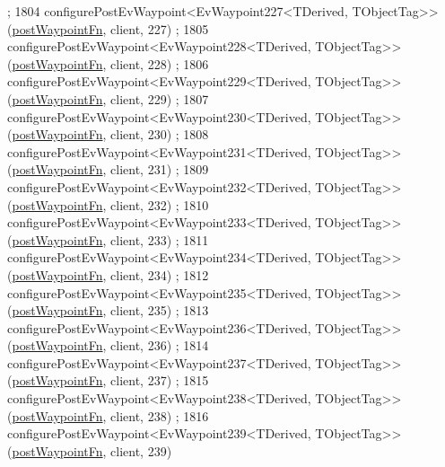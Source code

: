 \begin{DoxyCode}
      ;
1804     configurePostEvWaypoint<EvWaypoint227<TDerived, TObjectTag>>(\hyperlink{classmove__base__z__client_1_1WaypointEventDispatcher_acc538eb7506c13f7cca2268a1742dadd}{postWaypointFn}, client, 227)
      ;
1805     configurePostEvWaypoint<EvWaypoint228<TDerived, TObjectTag>>(\hyperlink{classmove__base__z__client_1_1WaypointEventDispatcher_acc538eb7506c13f7cca2268a1742dadd}{postWaypointFn}, client, 228)
      ;
1806     configurePostEvWaypoint<EvWaypoint229<TDerived, TObjectTag>>(\hyperlink{classmove__base__z__client_1_1WaypointEventDispatcher_acc538eb7506c13f7cca2268a1742dadd}{postWaypointFn}, client, 229)
      ;
1807     configurePostEvWaypoint<EvWaypoint230<TDerived, TObjectTag>>(\hyperlink{classmove__base__z__client_1_1WaypointEventDispatcher_acc538eb7506c13f7cca2268a1742dadd}{postWaypointFn}, client, 230)
      ;
1808     configurePostEvWaypoint<EvWaypoint231<TDerived, TObjectTag>>(\hyperlink{classmove__base__z__client_1_1WaypointEventDispatcher_acc538eb7506c13f7cca2268a1742dadd}{postWaypointFn}, client, 231)
      ;
1809     configurePostEvWaypoint<EvWaypoint232<TDerived, TObjectTag>>(\hyperlink{classmove__base__z__client_1_1WaypointEventDispatcher_acc538eb7506c13f7cca2268a1742dadd}{postWaypointFn}, client, 232)
      ;
1810     configurePostEvWaypoint<EvWaypoint233<TDerived, TObjectTag>>(\hyperlink{classmove__base__z__client_1_1WaypointEventDispatcher_acc538eb7506c13f7cca2268a1742dadd}{postWaypointFn}, client, 233)
      ;
1811     configurePostEvWaypoint<EvWaypoint234<TDerived, TObjectTag>>(\hyperlink{classmove__base__z__client_1_1WaypointEventDispatcher_acc538eb7506c13f7cca2268a1742dadd}{postWaypointFn}, client, 234)
      ;
1812     configurePostEvWaypoint<EvWaypoint235<TDerived, TObjectTag>>(\hyperlink{classmove__base__z__client_1_1WaypointEventDispatcher_acc538eb7506c13f7cca2268a1742dadd}{postWaypointFn}, client, 235)
      ;
1813     configurePostEvWaypoint<EvWaypoint236<TDerived, TObjectTag>>(\hyperlink{classmove__base__z__client_1_1WaypointEventDispatcher_acc538eb7506c13f7cca2268a1742dadd}{postWaypointFn}, client, 236)
      ;
1814     configurePostEvWaypoint<EvWaypoint237<TDerived, TObjectTag>>(\hyperlink{classmove__base__z__client_1_1WaypointEventDispatcher_acc538eb7506c13f7cca2268a1742dadd}{postWaypointFn}, client, 237)
      ;
1815     configurePostEvWaypoint<EvWaypoint238<TDerived, TObjectTag>>(\hyperlink{classmove__base__z__client_1_1WaypointEventDispatcher_acc538eb7506c13f7cca2268a1742dadd}{postWaypointFn}, client, 238)
      ;
1816     configurePostEvWaypoint<EvWaypoint239<TDerived, TObjectTag>>(\hyperlink{classmove__base__z__client_1_1WaypointEventDispatcher_acc538eb7506c13f7cca2268a1742dadd}{postWaypointFn}, client, 239)

\end{DoxyCode}
